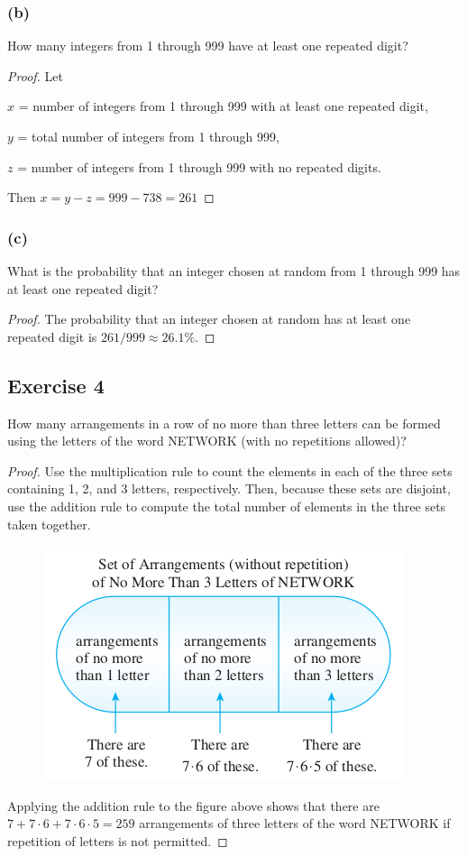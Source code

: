 \documentclass[14pt]{extarticle}
\begin{document}
\subsubsection{(b)}
How many integers from 1 through 999 have at least one repeated digit?

\begin{proof}
Let 

$x$ = number of integers from 1 through 999 with at least one repeated digit,

$y$ = total number of integers from 1 through 999,

$z$ = number of integers from 1 through 999 with no repeated digits.

Then \(x = y - z = 999 - 738 = 261\)
\end{proof}

\subsubsection{(c)}
What is the probability that an integer chosen at random from 1 through 999 has at least one repeated digit?

\begin{proof}
The probability that an integer chosen at random has at least one repeated digit is \(261/999 \approx 26.1\%\).
\end{proof}

\subsection{Exercise 4}
How many arrangements in a row of no more than three letters can be formed using the letters of the word NETWORK 
(with no repetitions allowed)?

\begin{proof}
Use the multiplication rule to count the elements in each of the three sets containing 1, 2, and 3 letters, 
respectively. Then, because these sets are disjoint, use the addition rule to compute the total number of elements 
in the three sets taken together.

\begin{figure}[ht!]
\centering
\includegraphics[scale=0.6]{../images/9.3.4.png}
\end{figure}

Applying the addition rule to the figure above shows that there are \(7 + 7 \cdot 6 + 7 \cdot 6 \cdot 5 = 259\) 
arrangements of three letters of the word NETWORK if repetition of letters is not permitted.
\end{proof}
\end{document}
